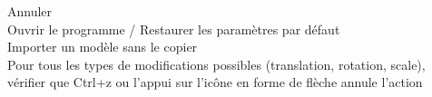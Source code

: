 Annuler	\\
	Ouvrir le programme / Restaurer les paramètres par défaut\\
		Importer un modèle sans le copier\\
		Pour tous les types de modifications possibles (translation, rotation, scale), vérifier que Ctrl+z ou l'appui sur l'icône en forme de flèche annule l'action
